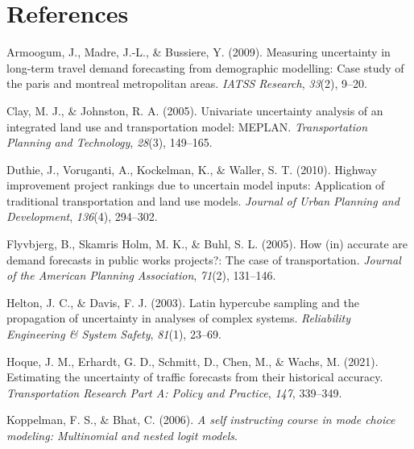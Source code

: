 \documentclass[fancy, masters,twoside]{byuthesis}
\newlength{\cslhangindent}
\newlength{\cslentryspacingunit} %
\newenvironment{CSLReferences}[2] %
 {%
  \setlength{\parindent}{0pt}
  \ifodd #1
  \let\oldpar\par
  \def\par{\hangindent=\cslhangindent\oldpar}
  \fi
  \setlength{\parskip}{#2\cslentryspacingunit}
 }%
 {}
\begin{document}
\hypertarget{references}{%
\chapter*{References}\label{references}}

\pagestyle{myrefs}

\hypertarget{refs}{}
\begin{CSLReferences}{1}{0}
\leavevmode{}%
Armoogum, J., Madre, J.-L., \& Bussiere, Y. (2009). Measuring uncertainty in long-term travel demand forecasting from demographic modelling: Case study of the paris and montreal metropolitan areas. \emph{IATSS Research}, \emph{33}(2), 9--20.

\leavevmode{}%
Clay, M. J., \& Johnston, R. A. (2005). Univariate uncertainty analysis of an integrated land use and transportation model: MEPLAN. \emph{Transportation Planning and Technology}, \emph{28}(3), 149--165.

\leavevmode{}%
Duthie, J., Voruganti, A., Kockelman, K., \& Waller, S. T. (2010). Highway improvement project rankings due to uncertain model inputs: Application of traditional transportation and land use models. \emph{Journal of Urban Planning and Development}, \emph{136}(4), 294--302.

\leavevmode{}%
Flyvbjerg, B., Skamris Holm, M. K., \& Buhl, S. L. (2005). How (in) accurate are demand forecasts in public works projects?: The case of transportation. \emph{Journal of the American Planning Association}, \emph{71}(2), 131--146.

\leavevmode{}%
Helton, J. C., \& Davis, F. J. (2003). Latin hypercube sampling and the propagation of uncertainty in analyses of complex systems. \emph{Reliability Engineering \& System Safety}, \emph{81}(1), 23--69.

\leavevmode{}%
Hoque, J. M., Erhardt, G. D., Schmitt, D., Chen, M., \& Wachs, M. (2021). Estimating the uncertainty of traffic forecasts from their historical accuracy. \emph{Transportation Research Part A: Policy and Practice}, \emph{147}, 339--349.

\leavevmode{}%
Koppelman, F. S., \& Bhat, C. (2006). \emph{A self instructing course in mode choice modeling: Multinomial and nested logit models}.


\end{CSLReferences}
\end{document}
